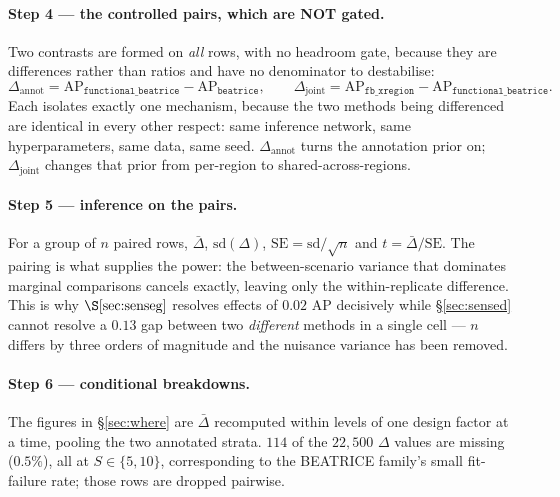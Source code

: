 \paragraph{Step 4 --- the controlled pairs, which are NOT gated.}
Two contrasts are formed on \emph{all} rows, with no headroom gate, because they
are differences rather than ratios and have no denominator to destabilise:
\[
\Delta_{\text{annot}}=\mathrm{AP}_{\texttt{functional\_beatrice}}-\mathrm{AP}_{\texttt{beatrice}},
\qquad
\Delta_{\text{joint}}=\mathrm{AP}_{\texttt{fb\_xregion}}-\mathrm{AP}_{\texttt{functional\_beatrice}} .
\]
Each isolates exactly one mechanism, because the two methods being differenced
are identical in every other respect: same inference network, same
hyperparameters, same data, same seed. $\Delta_{\text{annot}}$ turns the
annotation prior on; $\Delta_{\text{joint}}$ changes that prior from per-region
to shared-across-regions.

\paragraph{Step 5 --- inference on the pairs.}
For a group of $n$ paired rows, $\bar\Delta$, $\mathrm{sd}(\Delta)$,
$\mathrm{SE}=\mathrm{sd}/\sqrt n$ and $t=\bar\Delta/\mathrm{SE}$. The pairing is
what supplies the power: the between-scenario variance that dominates marginal
comparisons cancels exactly, leaving only the within-replicate difference. This
is why $\S\ref{sec:senseg}$ resolves effects of $0.02$ AP decisively while
\S\ref{sec:sensed} cannot resolve a $0.13$ gap between two \emph{different}
methods in a single cell --- $n$ differs by three orders of magnitude and the
nuisance variance has been removed.

\paragraph{Step 6 --- conditional breakdowns.}
The figures in \S\ref{sec:where} are $\bar\Delta$ recomputed within levels of one
design factor at a time, pooling the two annotated strata. $114$ of the $22{,}500$
$\Delta$ values are missing ($0.5\%$), all at $S\in\{5,10\}$, corresponding to
the BEATRICE family's small fit-failure rate; those rows are dropped pairwise.
